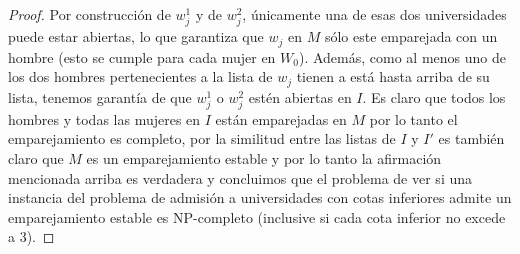 \begin{proof}
Por construcción de $w_j^1$ y de $w_j^2$, únicamente una de esas dos universidades puede estar abiertas, lo que garantiza que $w_j$ en $M$ sólo este emparejada con un hombre (esto se cumple para cada mujer en $W_0$). Además, como al menos uno de los dos hombres pertenecientes a la lista de $w_j$ tienen a está hasta arriba de su lista, tenemos garantía de que $w_j^1$ o $w_j^2$ estén abiertas en $I$. Es claro que todos los hombres y todas las mujeres en $I$ están emparejadas en $M$ por lo tanto el emparejamiento es completo, por la similitud entre las listas de $I$ y $I'$ es también claro que $M$ es un emparejamiento estable y por lo tanto la afirmación mencionada arriba es verdadera y concluimos que el problema de ver si una instancia del problema de admisión a universidades con cotas inferiores admite un emparejamiento estable es NP-completo (inclusive si cada cota inferior no excede a 3).
\end{proof}

